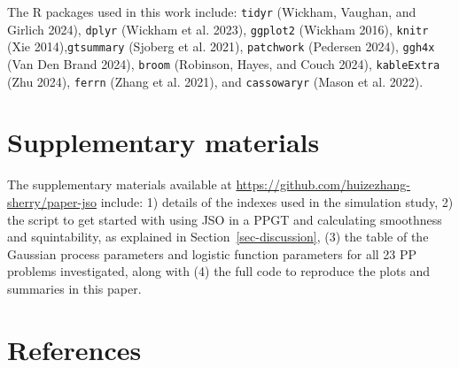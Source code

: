 \documentclass[
  12pt,
]{interact}
\theoremstyle{plain}
\begin{document}
The R packages used in this work include: \texttt{tidyr} (Wickham,
Vaughan, and Girlich 2024), \texttt{dplyr} (Wickham et al. 2023),
\texttt{ggplot2} (Wickham 2016), \texttt{knitr} (Xie
2014),\texttt{gtsummary} (Sjoberg et al. 2021), \texttt{patchwork}
(Pedersen 2024), \texttt{ggh4x} (Van Den Brand 2024), \texttt{broom}
(Robinson, Hayes, and Couch 2024), \texttt{kableExtra} (Zhu 2024),
\texttt{ferrn} (Zhang et al. 2021), and \texttt{cassowaryr} (Mason et
al. 2022).

\section*{Supplementary materials}\label{supplementary-materials}

The supplementary materials available at
\url{https://github.com/huizezhang-sherry/paper-jso} include: 1) details
of the indexes used in the simulation study, 2) the script to get
started with using JSO in a PPGT and calculating smoothness and
squintability, as explained in Section~\ref{sec-discussion}, (3) the
table of the Gaussian process parameters and logistic function
parameters for all 23 PP problems investigated, along with (4) the full
code to reproduce the plots and summaries in this paper.

\section*{References}\label{references}
\end{document}
